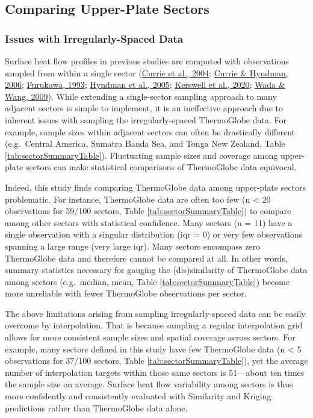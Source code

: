 \hypertarget{comparing-upper-plate-sectors}{%
\subsection{Comparing Upper-Plate Sectors}\label{comparing-upper-plate-sectors}}

\hypertarget{issues-with-irregularly-spaced-data}{%
\subsubsection{Issues with Irregularly-Spaced Data}\label{issues-with-irregularly-spaced-data}}

Surface heat flow profiles in previous studies are computed with observations sampled from within a single sector (\protect\hyperlink{ref-currie2004}{Currie et al., 2004}; \protect\hyperlink{ref-currie2006}{Currie \& Hyndman, 2006}; \protect\hyperlink{ref-furukawa1993}{Furukawa, 1993}; \protect\hyperlink{ref-hyndman2005}{Hyndman et al., 2005}; \protect\hyperlink{ref-kerswell2020}{Kerswell et al., 2020}; \protect\hyperlink{ref-wada2009}{Wada \& Wang, 2009}). While extending a single-sector sampling approach to many adjacent sectors is simple to implement, it is an ineffective approach due to inherent issues with sampling the irregularly-spaced ThermoGlobe data. For example, sample sizes within adjacent sectors can often be drastically different (e.g.~Central America, Sumatra Banda Sea, and Tonga New Zealand, Table \ref{tab:sectorSummaryTable}). Fluctuating sample sizes and coverage among upper-plate sectors can make statistical comparisons of ThermoGlobe data equivocal.

Indeed, this study finds comparing ThermoGlobe data among upper-plate sectors problematic. For instance, ThermoGlobe data are often too few (n \textless{} 20 observations for 59/100 sectors, Table \ref{tab:sectorSummaryTable}) to compare among other sectors with statistical confidence. Many sectors (n = 11) have a single observation with a singular distribution (\gls{iqr} = 0) or very few observations spanning a large range (very large \gls{iqr}). Many sectors encompass zero ThermoGlobe data and therefore cannot be compared at all. In other words, summary statistics necessary for gauging the (dis)similarity of ThermoGlobe data among sectors (e.g.~median, mean, Table \ref{tab:sectorSummaryTable}) become more unreliable with fewer ThermoGlobe observations per sector.

The above limitations arising from sampling irregularly-spaced data can be easily overcome by interpolation. That is because sampling a regular interpolation grid allows for more consistent sample sizes and spatial coverage across sectors. For example, many sectors defined in this study have few ThermoGlobe data (n \textless{} 5 observations for 37/100 sectors, Table \ref{tab:sectorSummaryTable}), yet the average number of interpolation targets within those same sectors is 51---about ten times the sample size on average. Surface heat flow variability among sectors is thus more confidently and consistently evaluated with Similarity and Kriging predictions rather than ThermoGlobe data alone.

